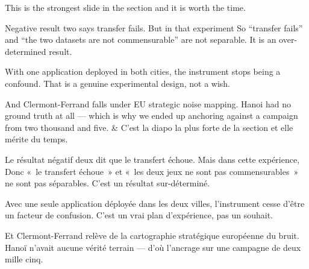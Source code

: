 \documentclass[10pt,a4paper]{article}
\begin{document}
\begin{say}
This is the strongest slide in the section and it is worth the time.

Negative result two says transfer fails. But in that experiment  So
``transfer fails'' and ``the two datasets are not commensurable'' are not
separable. It is an over-determined result.

With one application deployed in both cities, the instrument stops being a
confound.  That is a genuine
experimental design, not a wish.

And Clermont-Ferrand falls under EU strategic noise mapping.  Hanoi had no ground truth at all --- which is why we ended up anchoring
against a campaign from two thousand and five.
&
C'est la diapo la plus forte de la section et elle mérite du temps.

Le résultat négatif deux dit que le transfert échoue. Mais dans cette expérience,
 Donc «~le transfert échoue~» et «~les deux jeux ne sont pas commensurables~»
ne sont pas séparables. C'est un résultat sur-déterminé.

Avec une seule application déployée dans les deux villes, l'instrument cesse d'être
un facteur de confusion. 
C'est un vrai plan d'expérience, pas un souhait.

Et Clermont-Ferrand relève de la cartographie stratégique européenne du bruit.
 Hanoï n'avait aucune vérité terrain --- d'où
l'ancrage sur une campagne de deux mille cinq.
\end{say}
\end{document}
